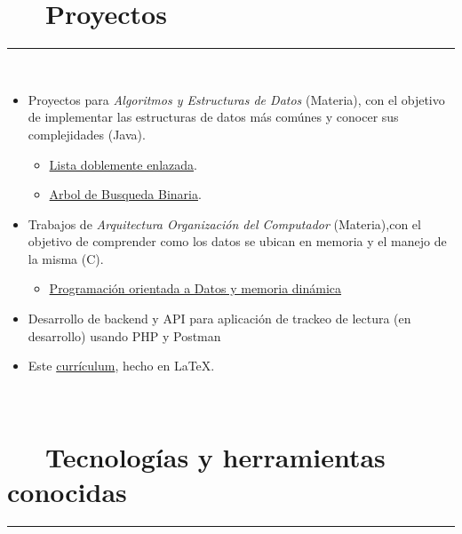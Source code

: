 \documentclass{article}
\begin{document}
\section*{\faFileCodeO ~~ Proyectos}
\hrule
\

\begin{itemize}
    \item Proyectos para \textit{Algoritmos y Estructuras de Datos} (Materia), con el objetivo de  implementar las estructuras de datos más comúnes y conocer sus complejidades (Java).
    \begin{itemize}
        \item\href{https://github.com/Agelar01/Algoritmos-y-estructuras-de-datos-/tree/main/Lista%20enlazada/main}{Lista doblemente enlazada}.
        \item \href{https://github.com/Agelar01/Algoritmos-y-estructuras-de-datos-/tree/main/ABB/main}{Arbol de Busqueda Binaria}.
       
    \end{itemize}
    \item Trabajos de \textit{Arquitectura Organización del Computador} (Materia),con el objetivo de comprender como los datos se ubican en memoria y el manejo de la misma (C).
    \begin{itemize}
        \item \href{https://github.com/Agelar01/Arquitectura-y-organizaci-n-del-Computador/tree/main/Programaci%C3%B3n%20orientada%20a%20datos%20y%20memoria%20din%C3%A1mica}{Programación orientada a Datos y memoria dinámica} 
    \end{itemize}
    \item Desarrollo de backend y API para aplicación de trackeo de lectura (en desarrollo) usando PHP y Postman
    \item Este \href{https://github.com/Agelar01/Resume}{currículum}, hecho en \LaTeX.
\end{itemize}




\
\newline
\


\section*{\faCogs ~~ Tecnologías y herramientas conocidas} 
\hrule
\

\
    
\end{document}
